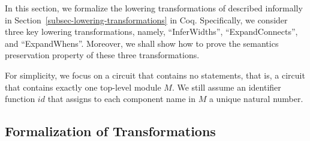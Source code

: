 
In this section, we formalize the lowering transformations of {\hifirrtl} described informally in Section~\ref{subsec-lowering-transformations} in Coq. Specifically, we consider three key lowering transformations, namely, %
``InferWidths'', %
``ExpandConnects'', and ``ExpandWhens''. %
Moreover, we shall show how to prove the semantics preservation property of these three transformations. 

For simplicity, we focus on a {\hifirrtl} circuit that contains no  statements, that is, a circuit that contains exactly one top-level module $M$. We still assume an identifier function $id$ that assigns to each component name in $M$ a unique natural number. 

\subsection{Formalization of Transformations}\label{sec:form-transform}


%
%


